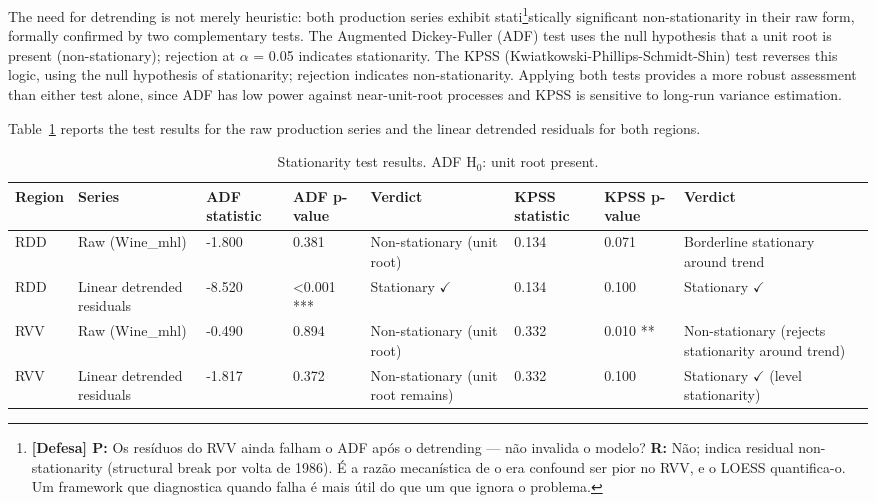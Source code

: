 The need for detrending is not merely heuristic: both production series exhibit stati\footnote{\textbf{[Defesa] P:} Os resíduos do RVV ainda falham o ADF após o detrending --- não invalida o modelo? \textbf{R:} Não; indica residual non-stationarity (structural break por volta de 1986). É a razão mecanística de o era confound ser pior no RVV, e o LOESS quantifica-o. Um framework que diagnostica quando falha é mais útil do que um que ignora o problema.}stically significant non-stationarity in their raw form, formally confirmed by two complementary tests. The Augmented Dickey-Fuller (ADF) test uses the null hypothesis that a unit root is present (non-stationary); rejection at $\alpha$ = 0.05 indicates stationarity. The KPSS (Kwiatkowski-Phillips-Schmidt-Shin) test reverses this logic, using the null hypothesis of stationarity; rejection indicates non-stationarity. Applying both tests provides a more robust assessment than either test alone, since ADF has low power against near-unit-root processes and KPSS is sensitive to long-run variance estimation.

Table~\ref{tab:ch3c_1} reports the test results for the raw production series and the linear detrended residuals for both regions.

\begin{table}[htbp]
  \centering
  \caption{Stationarity test results. ADF H$_0$: unit root present.}\label{tab:ch3c_1}
  \small
  \setlength{\tabcolsep}{4pt}
  \begin{adjustbox}{max width=\textwidth}
    \begin{tabularx}{\textwidth}{p{0.9cm}|p{2.2cm}|p{1.3cm}|p{1.3cm}|p{2cm}|p{1.3cm}|p{1.3cm}|X}
  \toprule
  Region & Series & ADF statistic & ADF p-value & Verdict & KPSS statistic & KPSS p-value & Verdict \\
  \midrule
  RDD & Raw (Wine\_mhl) & -1.800 & 0.381 & Non-stationary
(unit root) & 0.134 & 0.071 & Borderline stationary
around trend \\
  RDD & Linear detrended
residuals & -8.520 & <0.001 *** & Stationary $\checkmark$ & 0.134 & 0.100 & Stationary $\checkmark$ \\
  RVV & Raw (Wine\_mhl) & -0.490 & 0.894 & Non-stationary
(unit root) & 0.332 & 0.010 ** & Non-stationary
(rejects stationarity
around trend) \\
  RVV & Linear detrended
residuals & -1.817 & 0.372 & Non-stationary
(unit root remains) & 0.332 & 0.100 & Stationary $\checkmark$
(level stationarity) \\
  \bottomrule
\end{tabularx}
  \end{adjustbox}

\end{table}


